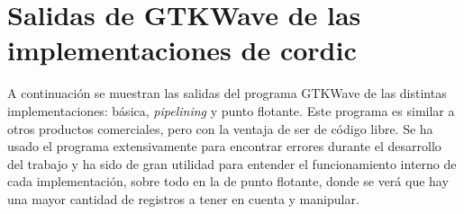 


\chapter{Salidas de GTKWave de las implementaciones de \gls{cordic}}
A continuación se muestran las salidas del programa GTKWave de las distintas implementaciones: básica, \textit{pipelining} y punto flotante. Este programa es similar a otros productos comerciales, pero con la ventaja de ser de código libre. Se ha usado el programa extensivamente para encontrar errores durante el desarrollo del trabajo y ha sido de gran utilidad para entender el funcionamiento interno de cada implementación, sobre todo en la de punto flotante, donde se verá que hay una mayor cantidad de registros a tener en cuenta y manipular.

